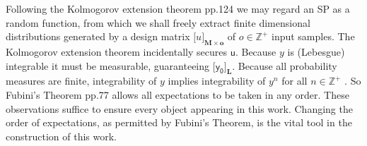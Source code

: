 \documentclass[preprint,12pt]{elsarticle}
\newcommand*{\x}{\times}
\newcommand*{\mi}[1]{\mathbf{#1}}
\newcommand*{\st}[1]{\mathbb{#1}}
\newcommand*{\rv}[1]{\mathsf{#1}}
\newcommand*{\tte}[2][]{\lbrack{#2}\rbrack_{#1}}
\begin{document}
    Following the Kolmogorov extension theorem \cite{Rogers.Williams2000} pp.124 we may regard an SP as a random function, from which we shall freely extract finite dimensional distributions generated by a design matrix $\tte[\mi{M\x o}]{u}$ of $o \in \st{Z}^{+}$ input samples.
    The Kolmogorov extension theorem incidentally secures $\rv{u}$. 
    Because $y$ is (Lebesgue) integrable it must be measurable, guaranteeing $\tte[\mi{L}]{\rv{y_0}}$.
    Because all probability measures are finite, integrability of $y$ implies integrability of $y^n$ for all $n \in \st{Z}^{+}$ \cite{Villani1985}. 
    So Fubini's Theorem \cite{Williams1991} pp.77 allows all expectations to be taken in any order. These observations suffice to ensure every object appearing in this work. Changing the order of expectations, as permitted by Fubini's Theorem, is the vital tool in the construction of this work. 
\end{document}
